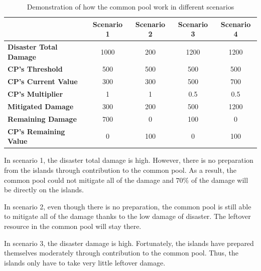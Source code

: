 \begin{table}[!htb]
\begin{center}
\begin{tabular}{|l|c|c|c|c|}
\hline
                               & \textbf{Scenario 1} & \textbf{Scenario 2} & \textbf{Scenario 3} & \textbf{Scenario 4} \\ \hline
\textbf{Disaster Total Damage} & 1000                & 200                 & 1200                & 1200                \\ \hline
\textbf{CP's Threshold}        & 500                 & 500                 & 500                 & 500                 \\ \hline
\textbf{CP's Current Value}    & 300                 & 300                 & 500                 & 700                 \\ \hline
\textbf{CP's Multiplier}       & 1                   & 1                   & 0.5                 & 0.5                 \\ \hline
\textbf{Mitigated Damage}      & 300                 & 200                 & 500                 & 1200                \\ \hline
\textbf{Remaining Damage}      & 700                 & 0                   & 100                 & 0                   \\ \hline
\textbf{CP's Remaining Value}  & 0                   & 100                 & 0                   & 100                 \\ \hline
\end{tabular}
\end{center}
\caption{Demonstration of how the common pool work in different scenarios}
\label{tab:Demonstration of how the common pool work in different scenarios}
\end{table}

In scenario 1, the disaster total damage is high. However, there is no preparation from the islands through contribution to the common pool. As a result, the common pool could not mitigate all of the damage and $70\%$ of the damage will be directly on the islands.

In scenario 2, even though there is no preparation, the common pool is still able to mitigate all of the damage thanks to the low damage of disaster. The leftover resource in the common pool will stay there.

In scenario 3, the disaster damage is high. Fortunately, the islands have prepared themselves moderately through contribution to the common pool. Thus, the islands only have to take very little leftover damage.

